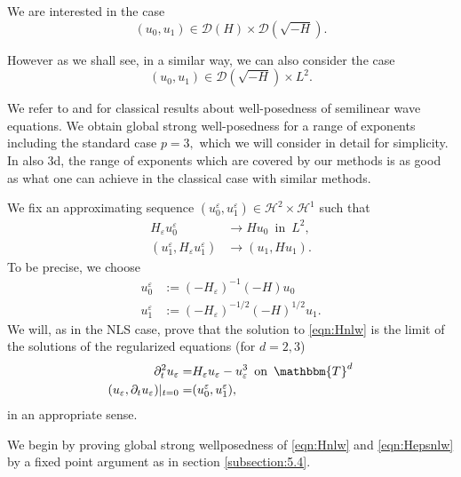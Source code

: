 \documentclass[11pt, oneside]{article}   	%
\newcommand{\tmop}[1]{\ensuremath{\operatorname{#1}}}
\newcommand{\ssp}{\mathscr{H}}
\begin{document}
We are interested in the case
\[ (u_0, u_1) \in \mathscr{D} (H) \times \mathscr{D} ( \sqrt{- H}). \]

However as we shall see, in a similar way, we can also consider the case
\[ (u_0, u_1) \in \mathscr{D} ( \sqrt{- H}
) \times  L^2 . \]

We refer to  \cite{tao2006nonlinear} and \cite{Evans10} for classical results about well-posedness of semilinear wave equations. We obtain global strong well-posedness for a range of exponents including the standard case $p=3,$ which we will consider in detail for simplicity. In also 3d,  the range of exponents which are covered by our methods is as good as what one can achieve in the classical case with similar methods.  

We fix an approximating sequence $(u^{\varepsilon}_0, u^{\varepsilon}_1) \in \ssp^2
\times \ssp^1$ such that
\begin{align*}
H_{\varepsilon} u^{\varepsilon}_0 &\rightarrow H u_0 \ \tmop{in} \ L^2,\\
(u^{\varepsilon}_1, H_{\varepsilon} u^{\varepsilon}_1)
&\rightarrow (u_1, H u_1) . 
\end{align*}
To be precise, we  choose
\begin{align*}
u_0^\varepsilon&:=(-H_\varepsilon)^{-1}(-H) u_0\\
u_1^\varepsilon&:=(-H_\varepsilon)^{-1/2}(-H)^{1/2} u_1.
\end{align*}
We will, as in the NLS case, prove that the solution to \eqref{eqn:Hnlw} is the limit of the solutions of the regularized equations (for $d=2,3$)
\begin{align}
\partial^2_t u_{\varepsilon}  = & H_{\varepsilon} u_{\varepsilon} -
u_{\varepsilon}^3 \ \tmop{on} \  \mathbbm{T}^d \label{eqn:Hepsnlw}\\
(u_{\varepsilon}, \partial_t u_{\varepsilon}) |_{t = 0}  = &
(u^{\varepsilon}_0, u^{\varepsilon}_1),\nonumber
\end{align}
in an appropriate sense.

We begin by proving global strong wellposedness of \eqref{eqn:Hnlw} and \eqref{eqn:Hepsnlw} by a  fixed point argument as in section \ref{subsection:5.4}.
\end{document}
